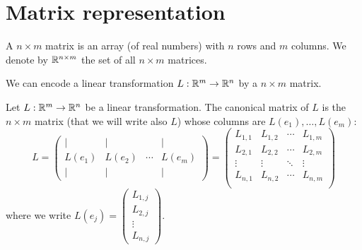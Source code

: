 \documentclass[11pt,nocut]{article}
\begin{document}

\section{Matrix representation}


\begin{definition}
	A $n \times m$ matrix is an array (of real numbers) with $n$ rows and $m$ columns.
	We denote by $\mathbb{R}^{n \times m}$ the set of all $n \times m$ matrices.
\end{definition}

We can encode a linear transformation $L: \mathbb{R}^m \to \mathbb{R}^n$ by a $n \times m$ matrix.
\begin{definition}\label{def:canonical_matrix}
	Let $L: \mathbb{R}^m \to \mathbb{R}^n$ be a linear transformation.
	The canonical matrix of $L$ is the $n \times m$ matrix (that we will write also $L$) whose columns are $L(e_1), \dots, L(e_m)$:
$$
L =
\begin{pmatrix}
	| & | & & | \\
	L(e_1) & L(e_2) & \cdots& L(e_m) \\
	| & | & & |
\end{pmatrix}
= 
\begin{pmatrix}
	L_{1,1} & L_{1,2} & \cdots & L_{1,m} \\
	L_{2,1} & L_{2,2} & \cdots & L_{2,m} \\
	\vdots & \vdots & \ddots & \vdots \\
	L_{n,1} & L_{n,2} & \cdots & L_{n,m} \\
\end{pmatrix}
$$
where we write $L(e_j) = 
\begin{pmatrix}
	L_{1,j} \\
	L_{2,j}\\
	\vdots \\
	L_{n,j}
\end{pmatrix}$.
\end{definition}
\end{document}
